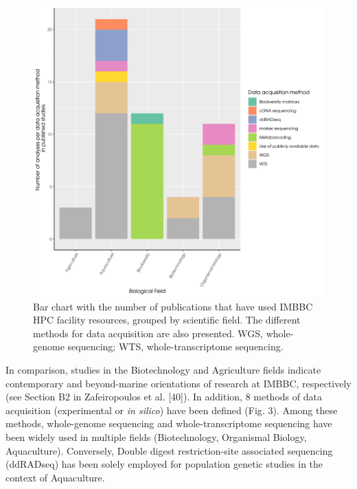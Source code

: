    \begin{figure}
      \centering
      \label{fig:studies}
      \includegraphics[width=\columnwidth]{figures/number_of_studies_biological_field_data_acquisition_method_plot.png}
      \caption[IMBBC HPC supported published studies grouped by scientific field]{
         Bar chart with the number of publications that have used IMBBC HPC facility resources, grouped by scientific field. The different methods for data acquisition are also presented. WGS, whole-genome sequencing; WTS, whole-transcriptome sequencing.
      }

   \end{figure}


   In comparison, studies in the Biotechnology and Agriculture fields indicate contemporary and beyond-marine orientations of research at IMBBC, respectively (see Section B2 in Zafeiropoulos et al. [40]). 
   In addition, $8$ methods of data acquisition (experimental or \textit{in silico}) have been defined (Fig. 3). 
   Among these methods, whole-genome sequencing and whole-transcriptome sequencing have been widely used in multiple fields (Biotechnology, Organismal Biology, Aquaculture). 
   Conversely, Double digest restriction-site associated sequencing (ddRADseq) has been solely employed for population genetic studies in the context of Aquaculture.

